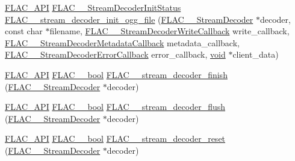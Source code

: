 \begin{DoxyCompactItemize}
\mbox{\hyperlink{group__flac__export_ga56ca07df8a23310707732b1c0007d6f5}{F\+L\+A\+C\+\_\+\+A\+PI}} \mbox{\hyperlink{group__flac__stream__decoder_gaaed54a24ac6310d29c5cafba79759c44}{F\+L\+A\+C\+\_\+\+\_\+\+Stream\+Decoder\+Init\+Status}} \mbox{\hyperlink{group__flac__stream__decoder_ga609f2a43987d6abeaef654575462030c}{F\+L\+A\+C\+\_\+\+\_\+stream\+\_\+decoder\+\_\+init\+\_\+ogg\+\_\+file}} (\mbox{\hyperlink{struct_f_l_a_c_____stream_decoder}{F\+L\+A\+C\+\_\+\+\_\+\+Stream\+Decoder}} $\ast$decoder, const char $\ast$filename, \mbox{\hyperlink{group__flac__stream__decoder_ga61e48dc2c0d2f6c5519290ff046874a4}{F\+L\+A\+C\+\_\+\+\_\+\+Stream\+Decoder\+Write\+Callback}} write\+\_\+callback, \mbox{\hyperlink{group__flac__stream__decoder_ga6aa87c01744c1c601b7f371f627b6e14}{F\+L\+A\+C\+\_\+\+\_\+\+Stream\+Decoder\+Metadata\+Callback}} metadata\+\_\+callback, \mbox{\hyperlink{group__flac__stream__decoder_gac896ee6a12668e9015fab4fbc6aae996}{F\+L\+A\+C\+\_\+\+\_\+\+Stream\+Decoder\+Error\+Callback}} error\+\_\+callback, \mbox{\hyperlink{_s_d_l__opengles2__gl2ext_8h_ae5d8fa23ad07c48bb609509eae494c95}{void}} $\ast$client\+\_\+data)
\item 
\mbox{\hyperlink{group__flac__export_ga56ca07df8a23310707732b1c0007d6f5}{F\+L\+A\+C\+\_\+\+A\+PI}} \mbox{\hyperlink{ordinals_8h_a95103469f1cbd78b8cf250194985b34e}{F\+L\+A\+C\+\_\+\+\_\+bool}} \mbox{\hyperlink{group__flac__stream__decoder_gaa51bb38f762ee11b320a0839f165c5ce}{F\+L\+A\+C\+\_\+\+\_\+stream\+\_\+decoder\+\_\+finish}} (\mbox{\hyperlink{struct_f_l_a_c_____stream_decoder}{F\+L\+A\+C\+\_\+\+\_\+\+Stream\+Decoder}} $\ast$decoder)
\item 
\mbox{\hyperlink{group__flac__export_ga56ca07df8a23310707732b1c0007d6f5}{F\+L\+A\+C\+\_\+\+A\+PI}} \mbox{\hyperlink{ordinals_8h_a95103469f1cbd78b8cf250194985b34e}{F\+L\+A\+C\+\_\+\+\_\+bool}} \mbox{\hyperlink{group__flac__stream__decoder_ga0109ce87f2c648b224b68c08b3c090cb}{F\+L\+A\+C\+\_\+\+\_\+stream\+\_\+decoder\+\_\+flush}} (\mbox{\hyperlink{struct_f_l_a_c_____stream_decoder}{F\+L\+A\+C\+\_\+\+\_\+\+Stream\+Decoder}} $\ast$decoder)
\item 
\mbox{\hyperlink{group__flac__export_ga56ca07df8a23310707732b1c0007d6f5}{F\+L\+A\+C\+\_\+\+A\+PI}} \mbox{\hyperlink{ordinals_8h_a95103469f1cbd78b8cf250194985b34e}{F\+L\+A\+C\+\_\+\+\_\+bool}} \mbox{\hyperlink{group__flac__stream__decoder_ga2342cf4f3caf9ad20fca1373aaea0c27}{F\+L\+A\+C\+\_\+\+\_\+stream\+\_\+decoder\+\_\+reset}} (\mbox{\hyperlink{struct_f_l_a_c_____stream_decoder}{F\+L\+A\+C\+\_\+\+\_\+\+Stream\+Decoder}} $\ast$decoder)
\item 

\end{DoxyCompactItemize}
